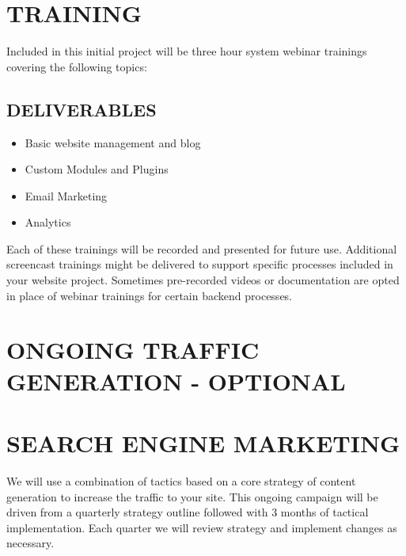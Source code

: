 \documentclass[12pt]{report}
\begin{document}
\section{TRAINING}
\item Included in this initial project will be three hour system webinar trainings covering the following topics:
\subsection{DELIVERABLES}
\begin{itemize}
\item Basic website management and blog
\item Custom Modules and Plugins
\item Email Marketing
\item Analytics
\end{itemize}
\item Each of these trainings will be recorded and presented for future use. Additional screencast trainings might be delivered to support specific processes included in your website project. Sometimes pre-recorded videos or documentation are opted in place of webinar trainings for certain backend processes.

\section{ONGOING TRAFFIC GENERATION - OPTIONAL}

\section{SEARCH ENGINE MARKETING}
\item We will use a combination of tactics based on a core strategy of content generation to increase the traffic to your site. This ongoing campaign will be driven from a quarterly strategy outline followed with 3 months of tactical implementation. Each quarter we will review strategy and implement changes as necessary.
\end{document}
